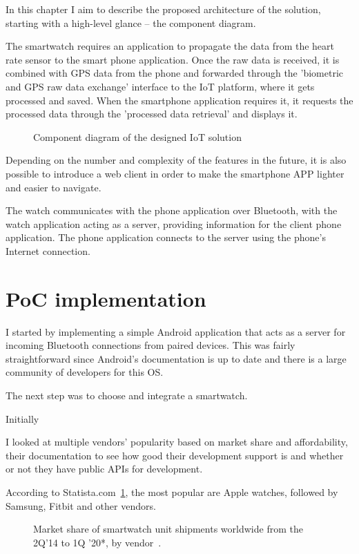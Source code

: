 In this chapter I aim to describe the proposed architecture of the solution, starting with a high-level glance -- the component diagram.

The smartwatch requires an application to propagate the data from the heart rate sensor to the smart phone application.
Once the raw data is received, it is combined with GPS data from the phone and forwarded through the 'biometric and GPS raw data exchange' interface to the IoT platform, where it gets processed and saved.
When the smartphone application requires it, it requests the processed data through the 'processed data retrieval' and displays it.

\begin{figure}[h]
    \caption{Component diagram of the designed IoT solution}
\end{figure}

Depending on the number and complexity of the features in the future, it is also possible to introduce a web client in order to make the smartphone APP lighter and easier to navigate.

The watch communicates with the phone application over Bluetooth, with the watch application acting as a server, providing information for the client phone application.
The phone application connects to the server using the phone's Internet connection.

\section{PoC implementation}

I started by implementing a simple Android application that acts as a server for incoming Bluetooth connections from paired devices.
This was fairly straightforward since Android's documentation is up to date and there is a large community of developers for this OS.

The next step was to choose and integrate a smartwatch.

Initially 

I looked at multiple vendors' popularity based on market share and affordability, their documentation to see how good their development support is and whether or not they have public APIs for development.

According to Statista.com~\ref{fig:watch_market_share}, the most popular are Apple watches, followed by Samsung, Fitbit and other vendors.

\begin{figure}[h]
    \caption{Market share of smartwatch unit shipments worldwide from the 2Q'14 to 1Q '20*, by vendor~\cite{watch_market_share}.}
    \label{fig:watch_market_share}
\end{figure}

